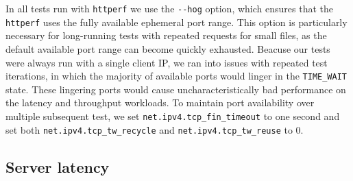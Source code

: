 \documentclass[twoside,10pt]{article}
\begin{document}
\begin{multicols}{2}
In all tests run with \verb+httperf+ we use the \verb+--hog+ option,
which ensures that the \verb+httperf+ uses the fully available
ephemeral port range. This option is particularly necessary for
long-running tests with repeated requests for small files, as the
default available port range can become quickly exhausted. Beacuse our
tests were always run with a single client IP, we ran into issues with
repeated test iterations, in which the majority of available ports
would linger in the \verb+TIME_WAIT+ state. These lingering ports
would cause uncharacteristically bad performance on the latency and
throughput workloads. To maintain port availability over multiple
subsequent test, we set \verb+net.ipv4.tcp_fin_timeout+ to one second
and set both \verb+net.ipv4.tcp_tw_recycle+ and
\verb+net.ipv4.tcp_tw_reuse+ to 0.

\subsection{Server latency}


\end{multicols}
\end{document}
